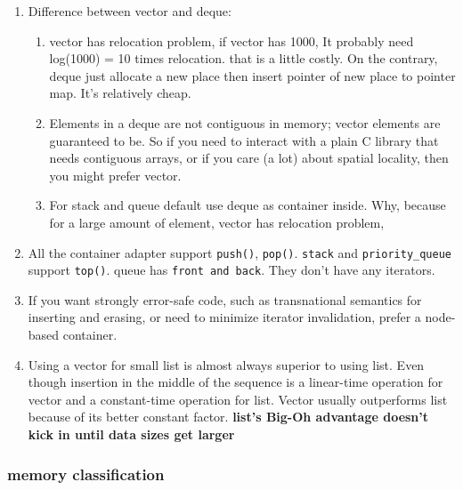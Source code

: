 \documentclass[a4paper,11pt,twoside]{book}
\begin{document}
\begin{itemize}
\begin{enumerate}
\item Difference between vector and deque:
\begin{enumerate}
\item vector has relocation problem, if vector has 1000, It probably need log(1000) = 10 times relocation. that is a little costly. On the contrary, deque just allocate a new place then insert pointer of new place to pointer map. It's relatively cheap.


\item Elements in a deque are not contiguous in memory; vector elements are guaranteed to be. So if you need to interact with a plain C library that needs contiguous arrays, or if you care (a lot) about spatial locality, then you might prefer vector.

\item For stack and queue default use deque as container inside. Why, because for a large amount of element, vector has relocation problem,
\end{enumerate}


\item All the container adapter support \texttt{push()}, \texttt{pop()}. \texttt{stack} and \texttt{priority\_queue} support \texttt{top()}. queue has \texttt{front and back}. They don't have any iterators.

\item If you want strongly error-safe code, such as transnational semantics for inserting and erasing, or need to minimize iterator invalidation, prefer a node-based container.

\item Using a vector for small list is almost always superior to using list. Even though insertion in the middle of the sequence is a linear-time operation for vector and a constant-time operation for list. Vector usually outperforms list because of its better constant factor. \textbf{list's Big-Oh advantage doesn't kick in until data sizes get larger}


\end{enumerate}

\end{itemize}


\subsubsection{memory classification}
\end{document}
